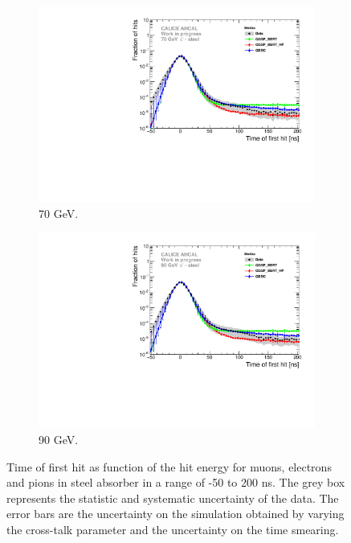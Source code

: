 \begin{figure}[htbp!]
\begin{subfigure}[t]{0.5\textwidth}
    \includegraphics[width=1\textwidth]{../Thesis_Plots/Timing/Pions/Plots/Comparison_SimData_Pion70GeV_LateClusters.pdf}
    \caption{70 GeV.} \label{fig:dNdt_SimData_70GeV}
  \end{subfigure}
  \hfill
  \begin{subfigure}[t]{0.5\textwidth}
    \centering
    \includegraphics[width=1\textwidth]{../Thesis_Plots/Timing/Pions/Plots/Comparison_SimData_Pion90GeV_LateClusters.pdf}
    \caption{90 GeV.} \label{fig:dNdt_SimData_90GeV}
  \end{subfigure}
  \caption{Time of first hit as function of the hit energy for muons, electrons and pions in steel absorber in a range of -50 to 200 ns. The grey box represents the statistic and systematic uncertainty of the data. The error bars are the uncertainty on the \mokka simulation obtained by varying the cross-talk parameter and the uncertainty on the time smearing.}
\end{figure}

